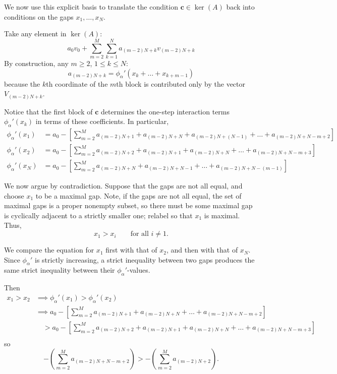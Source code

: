 \documentclass{article}
\begin{document}
We now use this explicit basis to translate the condition $\mathbf{c}\in\ker(A)$ back into conditions on the gaps $x_1,\dots,x_N$.

Take any element in $\ker(A)$:
\[
a_{0}v_{0} + \sum_{m=2}^{M} \sum_{k=1}^{N} a_{(m-2)N+k}v_{(m-2)N+k}
\]
By construction, any $m \geq 2$, $1 \leq k \leq N$:
\[
a_{(m-2)N+k} = \phi_\alpha '(x_{k}+\dots+x_{k+m-1})
\]
because the $k$th coordinate of the $m$th block is contributed only by the vector $V_{(m-2)N+k}$.


Notice that the first block of $\mathbf{c}$ determines the one-step interaction terms $\phi_\alpha'(x_k)$ in terms of these coefficients.
In particular,
\begin{align*}
\phi_\alpha '(x_{1}) &= a_{0} - \left[\sum_{m=2}^{M} a_{(m-2)N+1} + a_{(m-2)N+N} + a_{(m-2)N+(N-1)} + \dots + a_{(m-2)N+N-m+2}\right] \\
\phi_\alpha '(x_{2}) &=  a_{0} - \left[\sum_{m=2}^{M} a_{(m-2)N+2} + a_{(m-2)N+1} + a_{(m-2)N+N} + \dots + a_{(m-2)N+N-m+3}\right] \\
\phi_\alpha '(x_{N}) &=  a_{0} - \left[\sum_{m=2}^{M} a_{(m-2)N+N} + a_{(m-2)N+N-1} + \dots + a_{(m-2)N+N-(m-1)}\right]
\end{align*}

\noindent We now argue by contradiction. Suppose that the gaps are not all equal, and choose $x_1$ to be a maximal gap. Note, if the gaps are not all equal, the set of maximal gaps is a proper nonempty subset, so there must be some maximal gap is cyclically adjacent to a strictly smaller one; relabel so that $x_1$ is maximal. Thus,
\[
x_1> x_i
\qquad
\text{for all }i\neq1.
\]


We compare the equation for $x_1$ first with that of $x_2$, and then with that of $x_N$. Since $\phi_\alpha'$ is strictly increasing, a strict inequality between two gaps produces the same strict inequality between their $\phi_\alpha'$-values.

Then
\begin{align*}
x_{1} > x_{2} &\implies \phi_\alpha '(x_{1}) > \phi_\alpha '(x_{2}) \\
&\implies a_{0} - \left[\sum_{m=2}^{M} a_{(m-2)N+1} + a_{(m-2)N+N} + \dots + a_{(m-2)N+N-m+2}\right] \\
&\quad > a_{0} - \left[\sum_{m=2}^{M} a_{(m-2)N+2} + a_{(m-2)N+1} + a_{(m-2)N+N} + \dots + a_{(m-2)N+N-m+3}\right] \\
\end{align*}
so
\[-\left(\sum_{m=2}^{M} a_{(m-2)N+N-m+2}\right) > -\left(\sum_{m=2}^{M} a_{(m-2)N+2}\right).\]
\end{document}

